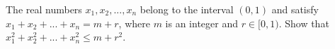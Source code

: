 The real numbers $x_1, x_2, ... , x_n$ belong to the interval $(0,1)$ and satisfy $x_1 + x_2 + ... + x_n = m + r$, where $m$ is an integer and $r \in [0,1)$. Show that $x_1 ^2 + x_2 ^2 + ... + x_n ^2 \leq m + r^2$.